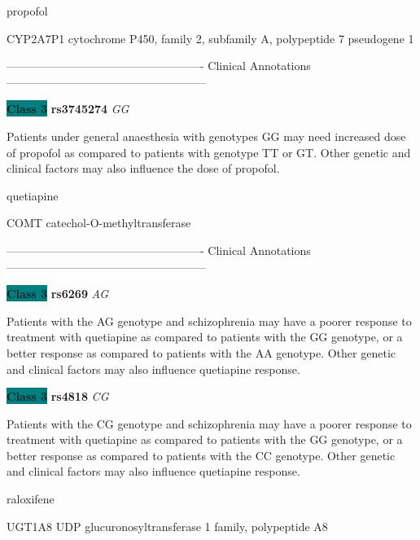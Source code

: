 \documentclass{resume} %
\begin{document}
\begin{rSection}{ propofol }
\begin{rSubsection}{ CYP2A7P1 }{ cytochrome P450, family 2, subfamily A, polypeptide 7 pseudogene 1 }{}{}
\item[] ---------------------------------------------------- Clinical Annotations -----------------------------------------------------\newline
\item \textbf{\colorbox{teal} {Class 3}} \textbf{ rs3745274 } \textit{ GG }
\item[] Patients under general anaesthesia with genotypes GG may need increased dose of propofol as compared to patients with genotype TT or GT. Other genetic and clinical factors may also influence the dose of propofol. 
\end{rSubsection}

\end{rSection}\begin{rSection}{ quetiapine }
\item[]

\begin{rSubsection}{ COMT }{ catechol-O-methyltransferase }{}{}
\item[]

\item[] ---------------------------------------------------- Clinical Annotations -----------------------------------------------------\newline
\item \textbf{\colorbox{teal} {Class 3}} \textbf{ rs6269 } \textit{ AG }
\item[] Patients with the AG genotype and schizophrenia may have a poorer response to treatment with quetiapine as compared to patients with the GG genotype, or a better response as compared to patients with the AA genotype. Other genetic and clinical factors may also influence quetiapine response. \item \textbf{\colorbox{teal} {Class 3}} \textbf{ rs4818 } \textit{ CG }
\item[] Patients with the CG genotype and schizophrenia may have a poorer response to treatment with quetiapine as compared to patients with the GG genotype, or a better response as compared to patients with the CC genotype. Other genetic and clinical factors may also influence quetiapine response. 
\end{rSubsection}

\end{rSection}\begin{rSection}{ raloxifene }
\item[]

\begin{rSubsection}{ UGT1A8 }{ UDP glucuronosyltransferase 1 family, polypeptide A8 }{}{}
\item[]


\end{rSubsection}
\end{rSection}
\end{document}
